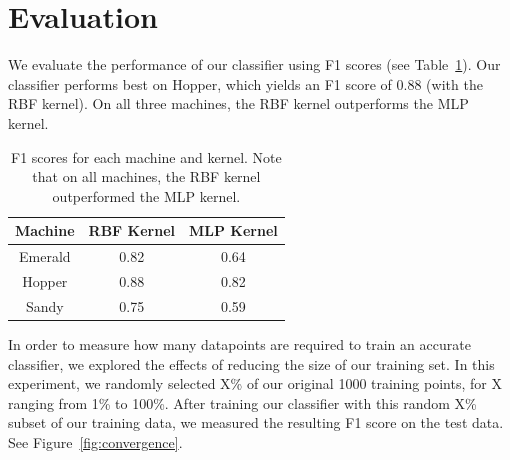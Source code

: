 \section{Evaluation}
\label{s:evaluation}


We evaluate the performance of our classifier using F1 scores (see Table~\ref{t:F1_scores}).
Our classifier performs best on Hopper, which yields an F1 score of 0.88 (with the RBF kernel).
On all three machines, the RBF kernel outperforms the MLP kernel.

\begin{table}[t]
    \begin{center}
        \begin{tabular}{c|c|c}
            Machine & RBF Kernel & MLP Kernel \\ \hline
            Emerald & 0.82 & 0.64 \\
            Hopper & 0.88 & 0.82 \\
            Sandy & 0.75 & 0.59 \\
        \end{tabular}
    \end{center}
    \caption{F1 scores for each machine and kernel. Note that on all machines, the RBF kernel outperformed the MLP kernel.}
    \label{t:F1_scores}
\end{table}

In order to measure how many datapoints are required to train an accurate classifier, we explored the effects of reducing the size of our training set.
In this experiment, we randomly selected X\% of our original 1000 training points, for X ranging from 1\% to 100\%.
After training our classifier with this random X\% subset of our training data, we measured the resulting F1 score on the test data. See Figure~\ref{fig:convergence}.

